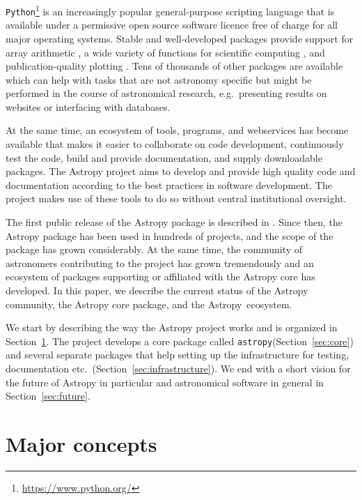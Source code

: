 \documentclass[modern]{aastex61}
\newcommand{\package}[1]{\texttt{#1}\xspace}
\newcommand{\python}{\package{Python}\xspace}
\newcommand{\astropy}{Astropy\xspace}
\newcommand{\astropypkg}{\package{astropy}\xspace}
\newcommand{\sectionname}{Section\xspace}
\begin{document}
\python\footnote{\url{https://www.python.org/}} is an increasingly popular
general-purpose scripting language that is available under a permissive open
source software licence free of charge for all major operating systems. Stable
and well-developed packages provide support for array arithmetic
\citep[\package{numpy},][]{numpy}, a wide variety of functions for scientific
computing \citep[\package{scipy},][]{numpy}, and publication-quality plotting
\citep[\package{matplotlib},][]{matplotlib}. Tens of thousands of other packages
are available which can help with tasks that are not astronomy specific but
might be performed in the course of astronomical research, e.g.\ presenting
results on websites or interfacing with databases.

At the same time, an ecosystem of tools, programs, and webservices
has become available that makes it easier to collaborate on code development,
continuously test the code, build and provide documentation, and
supply downloadable packages. The \astropy project aims to develop and
provide high quality code and documentation according to the best
practices in software development. The project makes use of these
tools to do so without central institutional oversight.

The first public release of the \astropy package is described in
\cite{astropy}. Since then, the \astropy package has been
used in hundreds of projects, and the scope of the package has grown
considerably. At the same time, the community of astronomers
contributing to the project has grown tremendously and an ecosystem
of packages supporting or affiliated with the \astropy core has
developed. In this paper, we describe the current status of the
\astropy community, the \astropy core package, and the \astropy\
ecosystem.

We start by describing the way the \astropy project works and is
organized in \sectionname~\ref{sec:concepts}.  The project develops a core
package called \astropypkg (\sectionname~\ref{sec:core}) and several
separate packages that help setting up the infrastructure for testing,
documentation etc.\ (\sectionname~\ref{sec:infrastructure}). 
We end with a short vision for
the future of \astropy in particular and astronomical software in general
in \sectionname~\ref{sec:future}.


\section{Major concepts}
\label{sec:concepts}
\end{document}
